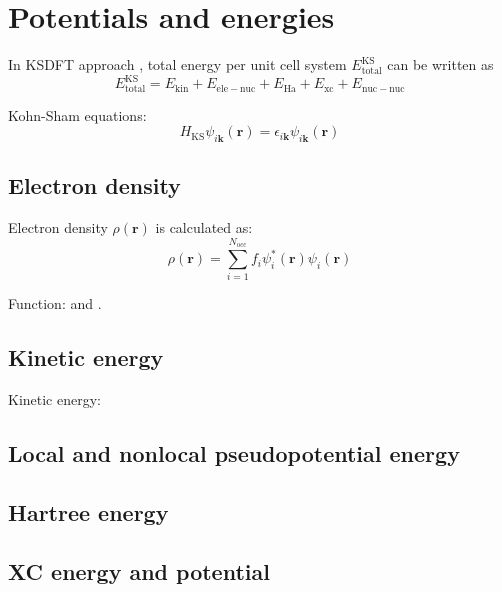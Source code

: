 \section{Potentials and energies}

In KSDFT approach \cite{Hohenberg1964,Kohn1965}, total energy per unit cell system
$E^{\mathrm{KS}}_{\mathrm{total}}$ can be written as
\begin{equation}
E^{\mathrm{KS}}_{\mathrm{total}} =
E_{\mathrm{kin}} + E_{\mathrm{ele-nuc}} +
E_{\mathrm{Ha}} + E_{\mathrm{xc}} + E_{\mathrm{nuc-nuc}}
\label{eq:E_KS_total}
\end{equation}

Kohn-Sham equations:
\begin{equation}
H_{\mathrm{KS}} \psi_{i\mathbf{k}}(\mathbf{r}) =
\epsilon_{i\mathbf{k}} \psi_{i\mathbf{k}}(\mathbf{r})
\end{equation}





\subsection{Electron density}

Electron density $\rho(\mathbf{r})$ is calculated as:
\begin{equation}
\rho(\mathbf{r}) = \sum_{i=1}^{N_{\mathrm{occ}}} f_{i} \psi^{*}_{i}(\mathbf{r})
\psi_{i}(\mathbf{r})
\end{equation}

Function:  and .

\subsection{Kinetic energy}

Kinetic energy:



\subsection{Local and nonlocal pseudopotential energy}


\subsection{Hartree energy}


\subsection{XC energy and potential}

